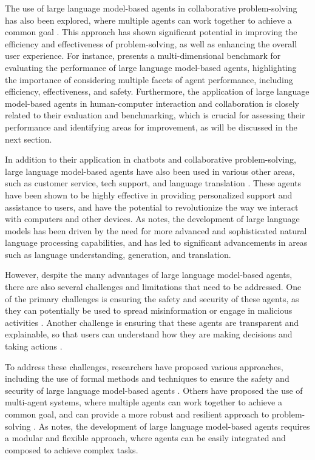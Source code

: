 \documentclass[11pt,a4paper]{article}
\begin{document}
The use of large language model-based agents in collaborative problem-solving has also been explored, where multiple agents can work together to achieve a common goal \cite{doi:10.1145/3712003}. This approach has shown significant potential in improving the efficiency and effectiveness of problem-solving, as well as enhancing the overall user experience. For instance, \cite{arxiv:2308.03688} presents a multi-dimensional benchmark for evaluating the performance of large language model-based agents, highlighting the importance of considering multiple facets of agent performance, including efficiency, effectiveness, and safety. Furthermore, the application of large language model-based agents in human-computer interaction and collaboration is closely related to their evaluation and benchmarking, which is crucial for assessing their performance and identifying areas for improvement, as will be discussed in the next section.

In addition to their application in chatbots and collaborative problem-solving, large language model-based agents have also been used in various other areas, such as customer service, tech support, and language translation \cite{arxiv:2411.04890}. These agents have been shown to be highly effective in providing personalized support and assistance to users, and have the potential to revolutionize the way we interact with computers and other devices. As \cite{arxiv:2303.18223} notes, the development of large language models has been driven by the need for more advanced and sophisticated natural language processing capabilities, and has led to significant advancements in areas such as language understanding, generation, and translation.

However, despite the many advantages of large language model-based agents, there are also several challenges and limitations that need to be addressed. One of the primary challenges is ensuring the safety and security of these agents, as they can potentially be used to spread misinformation or engage in malicious activities \cite{arxiv:2402.11208}. Another challenge is ensuring that these agents are transparent and explainable, so that users can understand how they are making decisions and taking actions \cite{arxiv:2402.01108}. 

To address these challenges, researchers have proposed various approaches, including the use of formal methods and techniques to ensure the safety and security of large language model-based agents \cite{arxiv:2402.00798}. Others have proposed the use of multi-agent systems, where multiple agents can work together to achieve a common goal, and can provide a more robust and resilient approach to problem-solving \cite{arxiv:2402.01680}. As \cite{arxiv:2410.06153} notes, the development of large language model-based agents requires a modular and flexible approach, where agents can be easily integrated and composed to achieve complex tasks.
\end{document}
